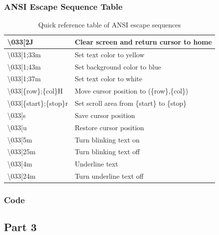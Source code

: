 \documentclass[12pt]{article}
\begin{document}
	\subsubsection{ANSI Escape Sequence Table}
		\begin{table}[h]
			\centering
			\begin{tabular}{|l|l|}
				\hline
				\textbackslash033[2J & Clear screen and return cursor to home \\ \hline
				\textbackslash033[1;33m & Set text color to yellow \\ \hline
				\textbackslash033[1;43m & Set background color to blue \\ \hline
				\textbackslash033[1;37m & Set text color to white\\ \hline
				\textbackslash033[\{row\};\{col\}H & Move cursor position to (\{row\},\{col\})\\ \hline
				\textbackslash033[\{start\};\{stop\}r & Set scroll area from \{start\} to \{stop\}\\ \hline
				\textbackslash033[s & Save cursor position\\ \hline
				\textbackslash033[u & Restore cursor position\\ \hline
				\textbackslash033[5m & Turn blinking text on\\ \hline
				\textbackslash033[25m & Turn blinking text off\\ \hline
				\textbackslash033[4m & Underline text\\ \hline
				\textbackslash033[24m & Turn underline text off\\ \hline		
				\hline
			\end{tabular}
			\caption{Quick reference table of ANSI escape sequences}
			\label{refTable}
		\end{table}
	\subsubsection{Code}
		

\pagebreak
\subsection{Part 3}
\end{document}

